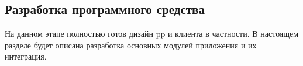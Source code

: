 \subsection{Разработка программного средства}
\label{sec:development:client}

На данном этапе полностью готов дизайн \gls{pp} и клиента в частности. В настоящем разделе будет описана разработка основных модулей приложения и их интеграция.




